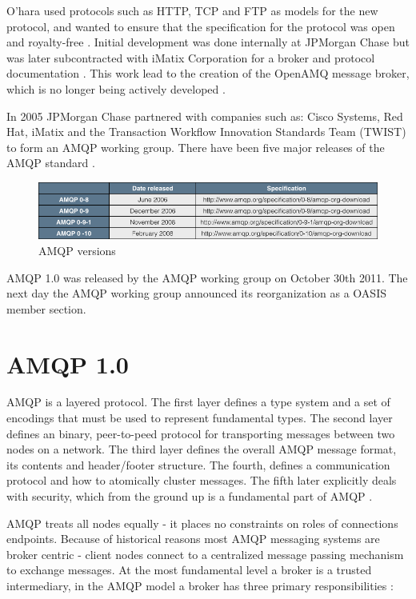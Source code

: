 \documentclass{thesis}
\begin{document}
O'hara used protocols such as HTTP, TCP and FTP as models for the new protocol, and wanted to ensure that the specification for the protocol was open and royalty-free \cite{o2007toward}.  Initial development was done internally at JPMorgan Chase but was later subcontracted with iMatix Corporation for a broker and protocol documentation \cite{Cameron}.  This work lead to the creation of the OpenAMQ message broker, which is no longer being actively developed \cite{openamq-eol}. 

In 2005 JPMorgan Chase partnered with companies such as: Cisco Systems, Red Hat, iMatix and the Transaction Workflow Innovation Standards Team (TWIST) to form an AMQP working group.  There have been five major releases of the AMQP standard \cite{AMQP_SPECS}.

\begin{figure}[ht]
\centering
\includegraphics[scale=.5]{amqp_versions}  
\caption{AMQP versions}
\label{fig:amqp-versions}
\end{figure}

AMQP 1.0 was released by the AMQP working group on October 30th 2011.  The next day the AMQP working group announced its reorganization as a OASIS member section\cite{AMQP}.

\section{AMQP 1.0}
AMQP is a layered protocol.  The first layer defines a type system and a set of encodings that must be used to represent fundamental types.  The second layer defines an binary, peer-to-peed protocol for transporting messages between two nodes on a network.  The third layer defines the overall AMQP message format, its contents and header/footer structure.  The fourth,  defines a communication protocol and how to atomically cluster messages.  The fifth later explicitly deals with security, which from the ground up is a fundamental part of AMQP \cite{AMQP1.0}. 

AMQP treats all nodes equally - it places no constraints on roles of connections endpoints.   Because of historical reasons most AMQP messaging systems are broker centric - client nodes connect to a centralized message passing mechanism to exchange messages.  At the most fundamental level a broker is a trusted intermediary, in the AMQP model a broker has three primary responsibilities \cite{o2007toward}:
\end{document}
